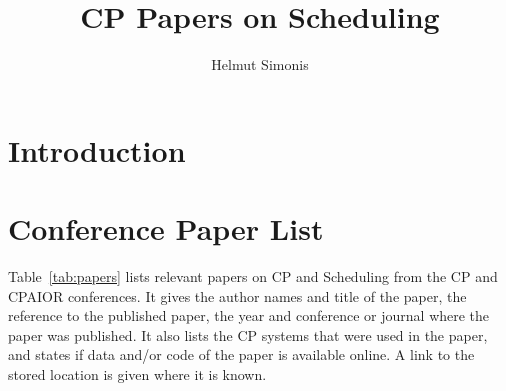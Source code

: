 \documentclass[a4paper]{article}
\title{CP Papers on Scheduling}
\author{Helmut Simonis}
\begin{document}

\maketitle
\section{Introduction}

\section{Conference Paper List}

Table~\ref{tab:papers} lists relevant papers on CP and Scheduling from the CP and CPAIOR conferences. It gives the author names and title of the paper, the reference to the published paper, the year and conference or journal where the paper was published. It also lists the CP systems that were used in the paper, and states if data and/or code of the paper is available online. A link to the stored location is given where it is known. 
\end{document}
